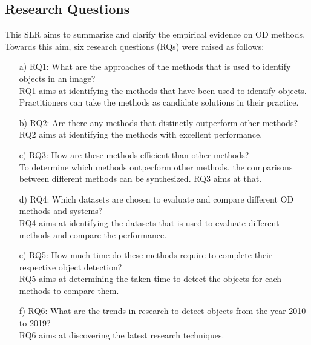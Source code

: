 \documentclass[two column]{ieeeaccess}
\begin{document}
\subsection{Research Questions}
This SLR aims to summarize and clarify the empirical evidence on OD methods. Towards this aim, six research questions (RQs) were raised as follows:
\begin{itemize}

    \item[a)]RQ1: What are the approaches of the methods that is used to identify objects in an image?\\
    RQ1 aims at identifying the methods that have been used to identify objects. Practitioners can take the methods as candidate solutions in their practice.
    
    \item[b)]RQ2: Are there any methods that distinctly outperform other methods? \\
    RQ2 aims at identifying the methods with excellent performance. 
    
    \item[c)]RQ3: How are these methods efficient than other methods? \\
    To determine which methods outperform other methods, the comparisons between different methods can be synthesized. RQ3 aims at that.
    
    \item[d)]RQ4: Which datasets are chosen to evaluate and compare different OD methods and systems? \\
    RQ4 aims at identifying the datasets that is used to evaluate different methods and compare the performance.
    
    \item[e)]RQ5: How much time do these methods require to complete their respective object detection?\\
    RQ5 aims at determining the taken time to detect the objects for each methods to compare them.
    
    \item[f)]RQ6: What are the trends in research to detect objects from the year 2010 to 2019?\\
    RQ6 aims at discovering the latest research techniques.
    
\end{itemize}
\end{document}
